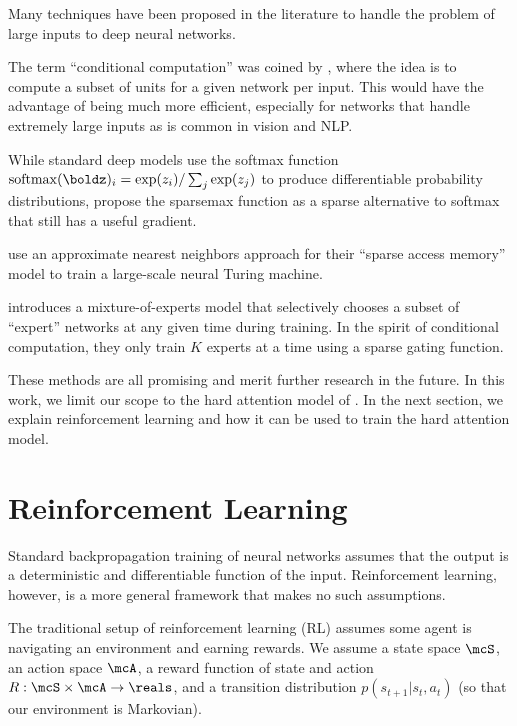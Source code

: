 \documentclass[11pt]{report}
\begin{document}

Many techniques have been proposed in the literature to handle the problem of large inputs to deep neural networks.

The term ``conditional computation'' was coined by \citet{BengioLC13}, where the idea is to compute a subset of units for a given network per input. This would have the advantage of being much more efficient, especially for networks that handle extremely large inputs as is common in vision and NLP.

While standard deep models use the softmax function $\mathrm{softmax}(\boldz)_i = \exp(z_i) / \sum_j \exp(z_j)$ to produce differentiable probability distributions, \citet{martins2016sparsemax} propose the sparsemax function as a sparse alternative to softmax that still has a useful gradient.

\citet{rae2016sparsememory} use an approximate nearest neighbors approach for their ``sparse access memory'' model to train a large-scale neural Turing machine.

\citet{Shazeer2017} introduces a mixture-of-experts model that selectively chooses a subset of ``expert'' networks at any given time during training. In the spirit of conditional computation, they only train $K$ experts at a time using a sparse gating function.

These methods are all promising and merit further research in the future. In this work, we limit our scope to the hard attention model of \citet{xu2015captioning}. In the next section, we explain reinforcement learning and how it can be used to train the hard attention model.

\section{Reinforcement Learning}

Standard backpropagation training of neural networks assumes that the output is a deterministic and differentiable function of the input. Reinforcement learning, however, is a more general framework that makes no such assumptions.

The traditional setup of reinforcement learning (RL) assumes some agent is navigating an environment and earning rewards.
We assume a state space $\mcS$, an action space $\mcA$, a reward function of state and action $R : \mcS \times \mcA \to \reals$, and a transition distribution $p(s_{t+1} | s_t, a_t)$ (so that our environment is Markovian).
\end{document}
